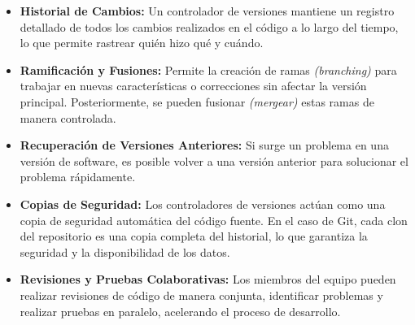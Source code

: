 \begin{itemize}
    \item \textbf{Historial de Cambios:} Un controlador de versiones mantiene un registro detallado de todos los cambios
                                         realizados en el código a lo largo del tiempo, lo que permite rastrear quién hizo qué y cuándo.                                              
    \item \textbf{Ramificación y Fusiones:} Permite la creación de ramas \textit{(branching)} para trabajar en nuevas características
                                            o correcciones sin afectar la versión principal. Posteriormente, se pueden fusionar 
                                            \textit{(mergear)} estas ramas de manera controlada.
    \item \textbf{Recuperación de Versiones Anteriores:} Si surge un problema en una versión de software, es posible volver
                                                         a una versión anterior para solucionar el problema rápidamente.
    \item \textbf{Copias de Seguridad:} Los controladores de versiones actúan como una copia de seguridad automática del código fuente.
                                        En el caso de Git, cada clon del repositorio es una copia completa del historial,
                                        lo que garantiza la seguridad y la disponibilidad de los datos.
    \item \textbf{Revisiones y Pruebas Colaborativas:} Los miembros del equipo pueden realizar revisiones de código de manera conjunta,
                                                       identificar problemas y realizar pruebas en paralelo, acelerando el proceso de desarrollo.
\end{itemize}

